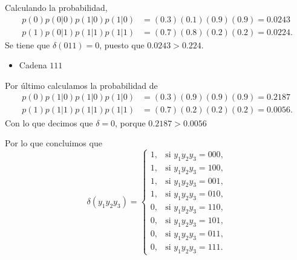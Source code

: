 \begin{sol}
Calculando la probabilidad,
\begin{align*}
p(0) p(0 | 0) p(1 | 0) p(1 | 0) &= (0.3)(0.1)(0.9)(0.9) = 0.0243\\
    p(1) p(0 | 1) p(1 | 1) p(1 | 1) &= (0.7)(0.8)(0.2)(0.2) = 0.0224
.\end{align*}
Se tiene que $\delta(011)=0$, puesto que $0.0243> 0.224$.

\begin{itemize}
    \item Cadena $111$
\end{itemize}
Por último calculamos la probabilidad de
\begin{align*}
p(0) p(1 | 0) p(1 | 0) p(1 | 0) &= (0.3)(0.9)(0.9)(0.9) = 0.2187\\
    p(1) p(1 | 1) p(1 | 1) p(1 | 1) &= (0.7)(0.2)(0.2)(0.2)=0.0056
.\end{align*}
Con lo que decimos que $\delta=0$, porque $0.2187>0.0056$

Por lo que concluimos que 
\[
\delta(y_1 y_2 y_3) =
\begin{cases}
1, & \text{si } y_1 y_2 y_3 = 000, \\
1, & \text{si } y_1 y_2 y_3 = 100, \\
1, & \text{si } y_1 y_2 y_3 = 001, \\
1, & \text{si } y_1 y_2 y_3 = 010, \\
0, & \text{si } y_1 y_2 y_3 = 110, \\
0, & \text{si } y_1 y_2 y_3 = 101, \\
0, & \text{si } y_1 y_2 y_3 = 011, \\
0, & \text{si } y_1 y_2 y_3 = 111.
\end{cases}
\]










    
\end{sol}